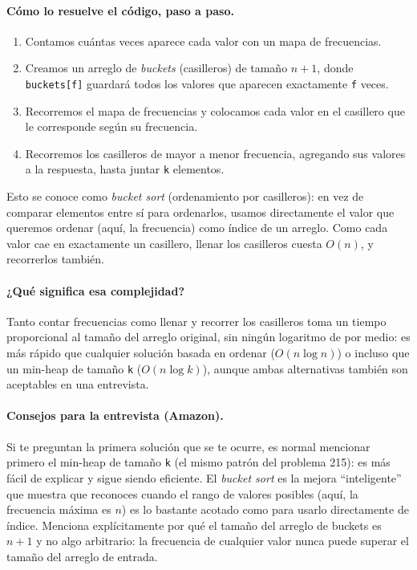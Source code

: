 \paragraph{Cómo lo resuelve el código, paso a paso.}
\begin{enumerate}
  \item Contamos cuántas veces aparece cada valor con un mapa de frecuencias.
  \item Creamos un arreglo de \emph{buckets} (casilleros) de tamaño
        $n+1$, donde \texttt{buckets[f]} guardará todos los valores que
        aparecen exactamente \texttt{f} veces.
  \item Recorremos el mapa de frecuencias y colocamos cada valor en el
        casillero que le corresponde según su frecuencia.
  \item Recorremos los casilleros de mayor a menor frecuencia, agregando sus
        valores a la respuesta, hasta juntar \texttt{k} elementos.
\end{enumerate}
Esto se conoce como \emph{bucket sort} (ordenamiento por casilleros): en vez
de comparar elementos entre sí para ordenarlos, usamos directamente el valor
que queremos ordenar (aquí, la frecuencia) como índice de un arreglo. Como
cada valor cae en exactamente un casillero, llenar los casilleros cuesta
$O(n)$, y recorrerlos también.




\paragraph{¿Qué significa esa complejidad?} Tanto contar frecuencias como
llenar y recorrer los casilleros toma un tiempo proporcional al tamaño del
arreglo original, sin ningún logaritmo de por medio: es más rápido que
cualquier solución basada en ordenar ($O(n \log n)$) o incluso que un
min-heap de tamaño \texttt{k} ($O(n \log k)$), aunque ambas alternativas
también son aceptables en una entrevista.

\paragraph{Consejos para la entrevista (Amazon).} Si te preguntan la primera
solución que se te ocurre, es normal mencionar primero el min-heap de
tamaño \texttt{k} (el mismo patrón del problema 215): es más fácil de
explicar y sigue siendo eficiente. El \emph{bucket sort} es la mejora
``inteligente'' que muestra que reconoces cuando el rango de valores
posibles (aquí, la frecuencia máxima es $n$) es lo bastante acotado como
para usarlo directamente de índice. Menciona explícitamente por qué el
tamaño del arreglo de buckets es $n+1$ y no algo arbitrario: la frecuencia
de cualquier valor nunca puede superar el tamaño del arreglo de entrada.
